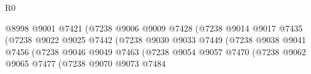 \begin{lexlean}{R0}
\begin{coremodule}
                                                    @8998
                                                    @9001
                                                    @7421
                                                    (@7238
                                                      @9006
                                                      @9009
                                                      @7428
                                                      (@7238
                                                        @9014
                                                        @9017
                                                        @7435
                                                        (@7238
                                                          @9022
                                                          @9025
                                                          @7442
                                                          (@7238
                                                            @9030
                                                            @9033
                                                            @7449
                                                            (@7238
                                                              @9038
                                                              @9041
                                                              @7456
                                                              (@7238
                                                                @9046
                                                                @9049
                                                                @7463
                                                                (@7238
                                                                  @9054
                                                                  @9057
                                                                  @7470
                                                                  (@7238
                                                                    @9062
                                                                    @9065
                                                                    @7477
                                                                    (@7238
                                                                      @9070
                                                                      @9073
                                                                      @7484

\end{coremodule}
\end{lexlean}
